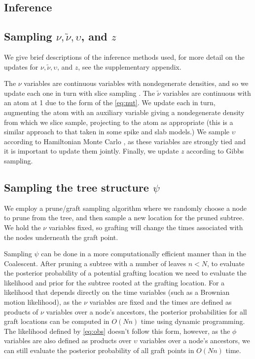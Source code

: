 \documentclass{bioinfo}
\newcommand{\nut}{\tilde{\nu}}
\begin{document}
\begin{methods}
\section{Inference}
\label{sec:inference}
\subsection{Sampling $\nu, \nut, \upsilon$, and $z$} 
We give brief descriptions of the inference methods used, for more detail on the updates for $\nu, \nut, \upsilon$, and $z$, see the supplementary appendix.

The $\nu$ variables are continuous variables with nondegenerate densities, and so we update each one in turn with slice sampling \cite{Neal2003a}.  The $\nut$ variables are continuous with an atom at 1 due to the form of the \eqref{eq:nut}.  We update each in turn, augmenting the atom with an auxiliary variable giving a nondegenerate density from which we slice sample, projecting to the atom as appropriate (this is a similar approach to that taken in some spike and slab models.)  We sample $\upsilon$ according to Hamiltonian Monte Carlo \cite{Duane1987}, as these variables are strongly tied and it is important to update them jointly.  Finally, we update $z$ according to Gibbs sampling.
\subsection{Sampling the tree structure $\psi$}
We employ a prune/graft sampling algorithm where we randomly choose a node to prune from the tree, and then sample a new location for the pruned subtree.  We hold the $\nu$ variables fixed, so grafting will change the times associated with the nodes underneath the graft point.

Sampling $\psi$ can be done in a more computationally efficient manner than in the Coalescent.  After pruning a subtree with a number of leaves $n < N$, to evaluate the posterior probability of a potential grafting location we need to evaluate the likelihood and prior for the subtree rooted at the grafting location.  For a likelihood that depends directly on the time variables (such as a Brownian motion likelihood), as the $\nu$ variables are fixed and the times are defined as products of $\nu$ variables over a node's ancestors, the posterior probabilities for all graft locations can be computed in $O(Nn)$ time using dynamic programming.  The likelihood defined by \eqref{eq:obs} doesn't follow this form, however, as the $\phi$ variables are also defined as products over $\upsilon$ variables over a node's ancestors, we can still evaluate the posterior probability of all graft points in $O(Nn)$ time.


\end{methods}
\end{document}

